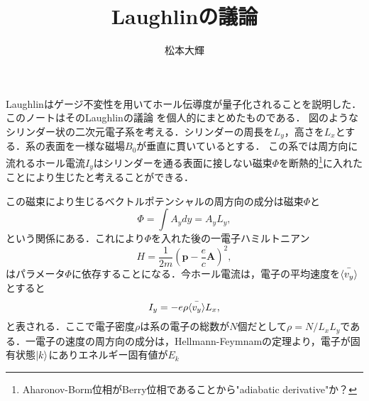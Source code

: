 \documentclass[]{jsarticle}
\title{Laughlinの議論}
\author{松本大輝}
\date{}
\begin{document}
\maketitle
Laughlinはゲージ不変性を用いてホール伝導度が量子化されることを説明した．このノートはそのLaughlinの議論
を個人的にまとめたものである．
図のようなシリンダー状の二次元電子系を考える．シリンダーの周長を$L_y$，高さを$L_x$とする．系の表面を一様な磁場$B_0$が垂直に貫いているとする．
この系では周方向に流れるホール電流$I_y$はシリンダーを通る表面に接しない磁束$\Phi$を断熱的\footnote{Aharonov-Borm位相がBerry位相であることから"adiabatic derivative"か？}に入れたことにより生じたと考えることができる．
\begin{center}
\end{center}
この磁束により生じるベクトルポテンシャルの周方向の成分は磁束$\Phi$と
\begin{equation}
    \Phi = \int A_y dy = A_y L_y,
\end{equation}
という関係にある．これにより$\Phi$を入れた後の一電子ハミルトニアン
\begin{equation}
    H = \frac{1}{2m} \left(\bm{p} - \frac{e}{c}\bm{A} \right)^2,
\end{equation}
はパラメータ$\Phi$に依存することになる．今ホール電流は，電子の平均速度を$\bar{\braket{v_y}}$とすると
\begin{equation}
    I_y = -e\rho\bar{\braket{v_y}}L_x,
\end{equation}
と表される．ここで電子密度$\rho$は系の電子の総数が$N$個だとして$\rho = N/L_xL_y$である．一電子の速度の周方向の成分は，Hellmann-Feymnamの定理より，電子が固有状態$\ket{k}$にありエネルギー固有値が$E_k$
\end{document}
